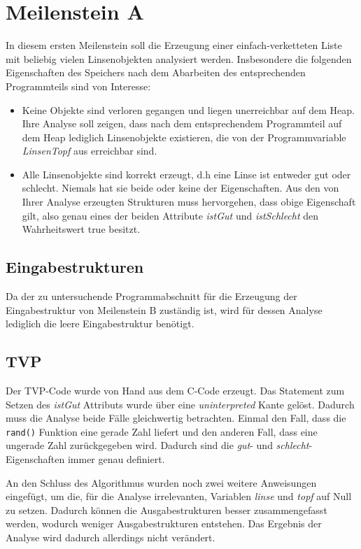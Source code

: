 \section{Meilenstein A}
In diesem ersten Meilenstein soll die Erzeugung einer einfach-verketteten Liste mit beliebig vielen Linsenobjekten analysiert werden. Insbesondere die folgenden Eigenschaften des Speichers nach dem Abarbeiten des entsprechenden Programmteils sind von Interesse:
\begin{itemize}
	\item Keine Objekte sind verloren gegangen und liegen unerreichbar auf dem Heap. Ihre Analyse soll zeigen, dass nach dem entsprechendem Programmteil auf dem Heap lediglich Linsenobjekte existieren, die von der Programmvariable \emph{LinsenTopf} aus erreichbar sind.
	\item Alle Linsenobjekte sind korrekt erzeugt, d.h eine Linse ist entweder gut oder schlecht. Niemals hat sie beide oder keine der Eigenschaften. Aus den von Ihrer Analyse erzeugten Strukturen muss hervorgehen, dass obige Eigenschaft gilt, also genau eines der beiden Attribute \emph{istGut} und \emph{istSchlecht} den Wahrheitswert true besitzt.
\end{itemize}


\subsection{Eingabestrukturen}
Da der zu untersuchende Programmabschnitt für die Erzeugung der Eingabestruktur von Meilenstein B zuständig ist, wird für dessen Analyse lediglich die leere Eingabestruktur benötigt. 


\subsection{TVP}
Der TVP-Code wurde von Hand aus dem C-Code erzeugt. Das Statement zum Setzen des \emph{istGut} Attributs wurde über eine \emph{uninterpreted} Kante gelöst. Dadurch muss die Analyse beide Fälle gleichwertig betrachten. Einmal den Fall, dass die \texttt{rand()} Funktion eine gerade Zahl liefert und den anderen Fall, dass eine ungerade Zahl zurückgegeben wird. Dadurch sind die \emph{gut}- und \emph{schlecht}-Eigenschaften immer genau definiert.

An den Schluss des Algorithmus wurden noch zwei weitere Anweisungen eingefügt, um die, für die Analyse irrelevanten, Variablen \emph{linse} und \emph{topf} auf Null zu setzen. Dadurch können die Ausgabestrukturen besser zusammengefasst werden, wodurch weniger Ausgabestrukturen entstehen. Das Ergebnis der Analyse wird dadurch allerdings nicht verändert.

